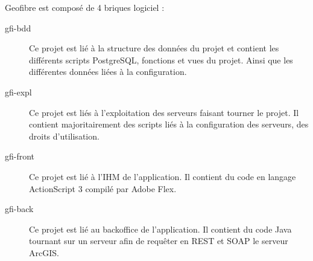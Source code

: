Geofibre est composé de 4 briques logiciel :
\begin{description}
	\item[gfi-bdd] Ce projet est lié à la structure des données du projet et contient les différents scripts PostgreSQL, fonctions et vues du projet. Ainsi que les différentes données liées à la configuration.
	\item[gfi-expl] Ce projet est liés à l'exploitation des serveurs faisant tourner le projet. Il contient majoritairement des scripts liés à la configuration des serveurs, des droits d'utilisation.
	\item[gfi-front] Ce projet est lié à l'IHM de l'application. Il contient du code en langage ActionScript 3 compilé par Adobe Flex.
	\item[gfi-back] Ce projet est lié au backoffice de l'application. Il contient du code Java tournant sur un serveur afin de requêter en REST et SOAP le serveur ArcGIS.
\end{description}
\begin{figure}[h]
\end{figure}
